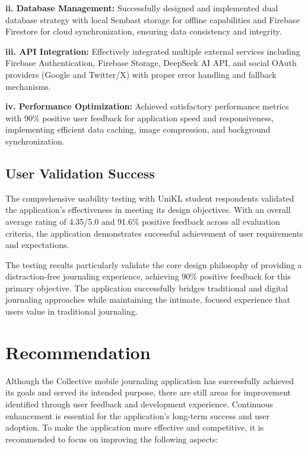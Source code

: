 \textbf{ii. Database Management:} Successfully designed and implemented dual database strategy with local Sembast storage for offline capabilities and Firebase Firestore for cloud synchronization, ensuring data consistency and integrity.

\textbf{iii. API Integration:} Effectively integrated multiple external services including Firebase Authentication, Firebase Storage, DeepSeek AI API, and social OAuth providers (Google and Twitter/X) with proper error handling and fallback mechanisms.

\textbf{iv. Performance Optimization:} Achieved satisfactory performance metrics with 90\% positive user feedback for application speed and responsiveness, implementing efficient data caching, image compression, and background synchronization.

\subsection{User Validation Success}

The comprehensive usability testing with UniKL student respondents validated the application's effectiveness in meeting its design objectives. With an overall average rating of 4.35/5.0 and 91.6\% positive feedback across all evaluation criteria, the application demonstrates successful achievement of user requirements and expectations.

The testing results particularly validate the core design philosophy of providing a distraction-free journaling experience, achieving 90\% positive feedback for this primary objective. The application successfully bridges traditional and digital journaling approaches while maintaining the intimate, focused experience that users value in traditional journaling.

\section{Recommendation}\label{sec:recommendation}

Although the Collective mobile journaling application has successfully achieved its goals and served its intended purpose, there are still areas for improvement identified through user feedback and development experience. Continuous enhancement is essential for the application's long-term success and user adoption. To make the application more effective and competitive, it is recommended to focus on improving the following aspects:

